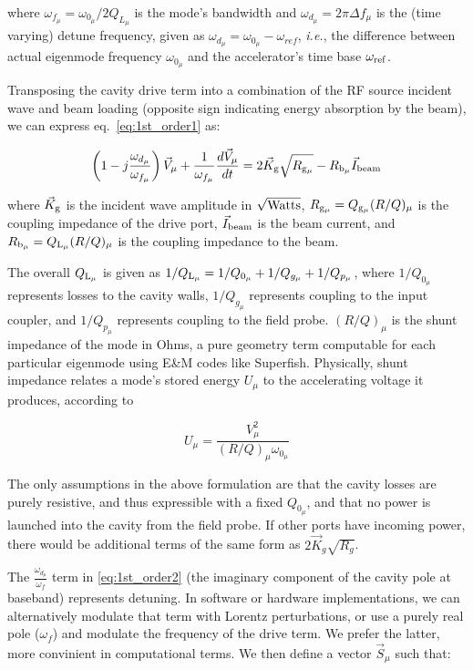 \documentclass[a4paper,12pt]{article}
\begin{document}
\noindent where $\omega_{f_{\mu}}=\omega_{0_{\mu}}/2Q_{L_{\mu}}$ is the mode's bandwidth and $\omega_{d_{\mu}}=2\pi\Delta f_{\mu}$ is the (time varying) detune frequency, given as $\omega_{d_{\mu}}=\omega_{0_{\mu}}-\omega_{ref}$, {\it i.e.}, the difference between actual eigenmode frequency $\omega_{0_{\mu}}$ and the accelerator's time base $\omega_{\rm ref}$.

Transposing the cavity drive term into a combination of the RF source incident wave and beam loading (opposite sign indicating energy absorption by the beam), we can express eq.~\ref{eq:1st_order1} as:

\begin{equation}
  \left(1-j\frac{\omega_{d_{\mu}}}{\omega_{f_{\mu}}}\right)\vec V_{\mu} + {\frac{1}{\omega_{f_{\mu}}}}\frac{d\vec V_{\mu}}{dt} =  2\vec K_{\rm g}\sqrt{R_{\rm g_{\mu}}} - R_{\rm b_{\mu}}\vec I_{\rm beam}
  \label{eq:1st_order2}
\end{equation}

\noindent where $\vec K_{\rm g}$ is the incident wave amplitude in $\sqrt{\rm Watts}$, $R_{\rm g_{\mu}}=Q_{\rm g_{\mu}}(R/Q)_{\mu}$ is the coupling impedance of the drive port, $\vec I_{\rm beam}$ is the beam current, and $R_{\rm b_{\mu}}=Q_{\rm L_{\mu}}(R/Q)_{\mu}$ is the coupling impedance to the beam.

The overall $Q_{\rm L_{\mu}}$ is given as $1/Q_{\rm L_{\mu}}=1/Q_{0_{\mu}}+1/Q_{g_{\mu}}+1/Q_{p_{\mu}}$, where $1/Q_{0_{\mu}}$ represents losses to the cavity walls, $1/Q_{g_{\mu}}$ represents coupling to the input coupler, and $1/Q_{p_{\mu}}$ represents coupling to the field probe. $(R/Q)_{\mu}$ is the shunt impedance of the mode in Ohms, a pure geometry term computable for each particular eigenmode using E\&M codes like Superfish. Physically, shunt impedance relates a mode's stored energy $U_{\mu}$ to the accelerating voltage it produces, according to 

\begin{equation}
  U_{\mu} = \frac{V_{\mu}^2}{(R/Q)_{\mu}\omega_{0_{\mu}}}
\end{equation}

The only assumptions in the above formulation are that the cavity losses are purely resistive, and thus expressible with a fixed $Q_{0_{\mu}}$, and that no power is launched into the cavity from the field probe.  If other ports have incoming power, there would be additional terms of the same form as $2\vec K_g\sqrt{R_g}$.

The $\frac{\omega_{d_\mu}}{\omega_{f}}$ term in \ref{eq:1st_order2} (the imaginary component of the cavity pole at baseband) represents detuning. In software or hardware implementations, we can alternatively modulate that term with Lorentz perturbations, or use a purely real pole ($\omega_f$) and modulate the frequency of the drive term. We prefer the latter, more convinient in computational terms. We then define a vector $\vec{S}_{\mu}$ such that:
\end{document}
